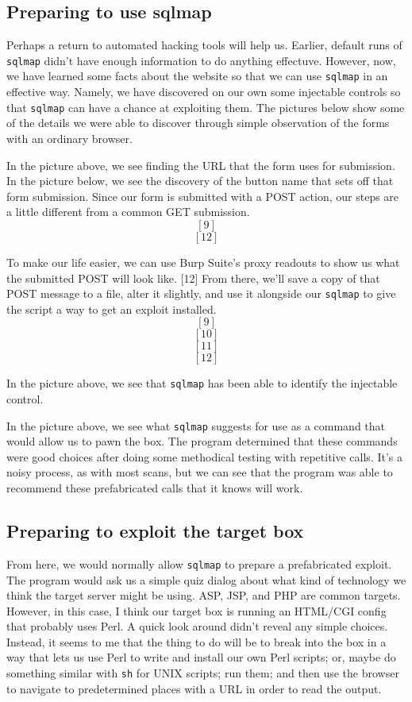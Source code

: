\subsection{Preparing to use sqlmap}
Perhaps a return to automated hacking tools will help us.  Earlier, default runs of \texttt{sqlmap} didn't have enough information to do anything effectuve.  However, now, we have learned some facts about the website so that we can use \texttt{sqlmap} in an effective way.  Namely, we have discovered on our own some injectable controls so that \texttt{sqlmap} can have a chance at exploiting them.  The pictures below show some of the details we were able to discover through simple observation of the forms with an ordinary browser.

In the picture above, we see finding the URL that the form uses for submission.  In the picture below, we see the discovery of the button name that sets off that form submission.  Since our form is submitted with a POST action, our steps are a little different from a common GET submission.  \[[9]\]\[[12]\]


To make our life easier, we can use Burp Suite's proxy readouts to show us what the submitted POST will look like. [12]  From there, we'll save a copy of that POST message to a file, alter it slightly, and use it alongside our \texttt{sqlmap} to give the script a way to get an \gls{exploit} installed.  \[[9]\]\[[10]\]\[[11]\]\[[12]\]

In the picture above, we see that \texttt{sqlmap} has been able to identify the injectable control.  

In the picture above, we see what \texttt{sqlmap} suggests for use as a command that would allow us to pawn the box.  The program determined that these commands were good choices after doing some methodical testing with repetitive calls.  It's a noisy process, as with most scans, but we can see that the program was able to recommend these prefabricated calls that it knows will work.

\subsection{Preparing to exploit the target box}
From here, we would normally allow \texttt{sqlmap} to prepare a prefabricated exploit.  The program would ask us a simple quiz dialog about what kind of technology we think the target server might be using.  ASP, JSP, and PHP are common targets.  However, in this case, I think our target box is running an HTML/CGI config that probably uses Perl.  A quick look around didn't reveal any simple choices.  Instead, it seems to me that the thing to do will be to break into the box in a way that lets us use Perl to write and install our own Perl scripts; or, maybe do something similar with \texttt{sh} for UNIX scripts; run them; and then use the browser to navigate to predetermined places with a URL in order to read the output.  

